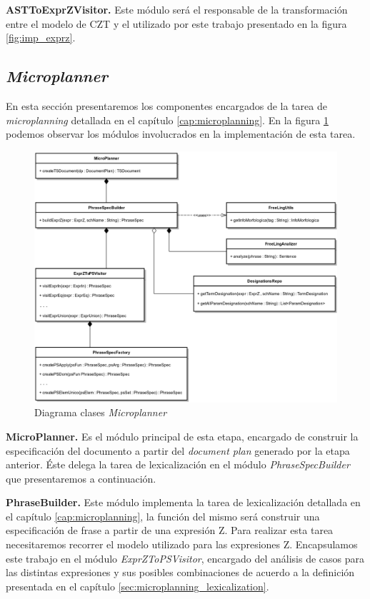 \bigskip
\noindent
\textbf{ASTToExprZVisitor.} Este módulo será el responsable de la transformación entre el modelo de CZT y el utilizado por este trabajo presentado en la figura \ref{fig:imp_exprz}.


\subsection{\textit{Microplanner}}

En esta sección presentaremos los componentes encargados de la tarea de \textit{microplanning} detallada en el capítulo \ref{cap:microplanning}. En la figura \ref{fig:imp_microplanner} podemos observar los módulos involucrados en la implementación de esta tarea.

\begin{figure}[H]
  	\centering
	\includegraphics[scale=0.2]{img/microplanner_imp.png}
	\caption{Diagrama clases \textit{Microplanner}}
  	\label{fig:imp_microplanner}
\end{figure}

\bigskip
\noindent
\textbf{MicroPlanner.} Es el módulo principal de esta etapa, encargado de construir la especificación del documento a partir del \textit{document plan} generado por la etapa anterior. Éste delega la tarea de lexicalización en el módulo \textit{PhraseSpecBuilder} que presentaremos a continuación.

\bigskip
\noindent
\textbf{PhraseBuilder.} Este módulo implementa la tarea de lexicalización detallada en el capítulo \ref{cap:microplanning}, la función del mismo será construir una especificación de frase a partir de una expresión Z. Para realizar esta tarea necesitaremos recorrer el modelo utilizado para las expresiones Z. Encapsulamos este trabajo en el módulo \textit{ExprZToPSVisitor}, encargado del análisis de casos para las distintas expresiones y sus posibles combinaciones de acuerdo a la definición presentada en el capítulo \ref{sec:microplanning_lexicalization}.

